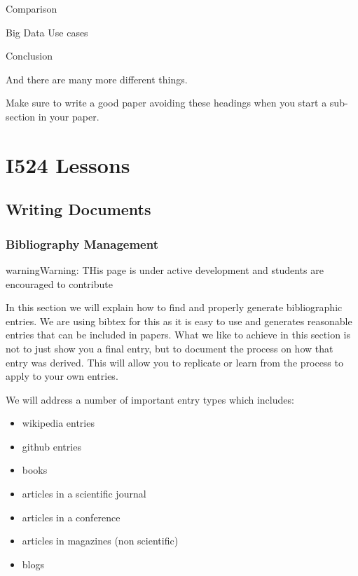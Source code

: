 Comparison

Big Data Use cases

Conclusion

And there are many more different things.

Make sure to write a good paper avoiding these headings when you start a sub-section in your paper.


\chapter{I524 Lessons}
\label{\detokenize{notes:i524-lessons}}

\section{Writing Documents}
\label{\detokenize{lesson/doc/index:writing-documents}}\label{\detokenize{lesson/doc/index::doc}}

\subsection{Bibliography Management}
\label{\detokenize{lesson/doc/bibtex:bibliography-management}}\label{\detokenize{lesson/doc/bibtex::doc}}
\begin{sphinxadmonition}{warning}{Warning:}
THis page is under active development and students are
encouraged to contribute
\end{sphinxadmonition}

In this section we will explain how to find and properly generate
bibliographic entries. We are using bibtex for this as it is easy to
use and generates reasonable entries that can be included in
papers. What we like to achieve in this section is not to just show
you a final entry, but to document the process on how that entry was
derived. This will allow you to replicate or learn from the process to
apply to your own entries.

We will address a number of important entry types which includes:
\begin{itemize}
\item {} 
wikipedia entries

\item {} 
github entries

\item {} 
books

\item {} 
articles in a scientific journal

\item {} 
articles in a conference

\item {} 
articles in magazines (non scientific)

\item {} 
blogs

\end{itemize}


